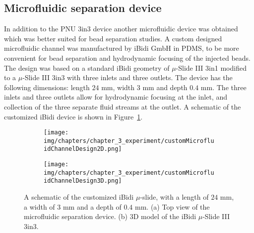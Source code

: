 \subsection{Microfluidic separation device}\label{subsec:microfluidicSeparationDevice}
In addition to the PNU 3in3 device another microfluidic device was obtained which was better suited for bead separation studies. A custom designed microfluidic channel was manufactured by iBidi GmbH in PDMS, to be more convenient for bead separation and hydrodynamic focusing of the injected beads. The design was based on a standard iBidi geometry of $\mu$-Slide III 3in1 modified to a $\mu$-Slide III 3in3 with three inlets and three outlets. The device has the following dimensions: length $24$ mm, width $3$ mm and depth $0.4$ mm. The three inlets and three outlets allow for hydrodynamic focusing at the inlet, and collection of the three separate fluid streams at the outlet. A schematic of the customized iBidi device is shown in Figure~\ref{fig:newMicrofluidChannelDesign}. 

\begin{figure}[htb]
        \centering
        \begin{subfigure}[b]{0.48\textwidth}
                \texttt{[image: img/chapters/chapter\_3\_experiment/customMicrofluidChannelDesign2D.png]}
                \caption{}  
        \end{subfigure}
        \hfill
        \begin{subfigure}[b]{0.48\textwidth}
                \texttt{[image: img/chapters/chapter\_3\_experiment/customMicrofluidChannelDesign3D.png]}
                \caption{}                
        \end{subfigure}
        \caption[Schematic of the customized iBidi $\mu$-slide]{A schematic of the customized iBidi $\mu$-slide, with a length of $24$ mm, a width of $3$ mm and a depth of $0.4$ mm. (a) Top view of the microfluidic separation device. (b) 3D model of the iBidi $\mu$-Slide III 3in3.}
        \label{fig:newMicrofluidChannelDesign}
\end{figure}

